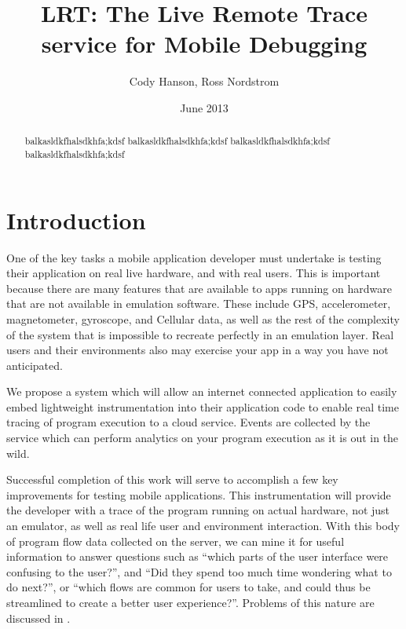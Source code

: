 \documentclass[11pt]{article}
\begin{document}
\title{LRT: The Live Remote Trace service for Mobile Debugging}
\author{Cody Hanson, Ross Nordstrom}
\date{June 2013}

\maketitle

\begin{abstract}
balkasldkfhalsdkhfa;kdsf
balkasldkfhalsdkhfa;kdsf
balkasldkfhalsdkhfa;kdsf
balkasldkfhalsdkhfa;kdsf

\end{abstract}

\section{Introduction}
One of the key tasks a mobile application developer must undertake is testing 
their application on real live hardware, and with real users. This is important 
because there are many features that are available to apps running on hardware 
that are not available in emulation software. These include GPS, accelerometer, 
magnetometer, gyroscope, and Cellular data, as well as the rest of the 
complexity of the system that is impossible to recreate perfectly in an 
emulation layer. Real users and their environments also may exercise your app in
a way you have not anticipated. 

\cite{Enck:2010:TIT:1924943.1924971}

We propose a system which will allow an internet connected application to easily
embed lightweight instrumentation into their application code to enable real 
time tracing of program execution to a cloud service. Events are collected by 
the service which can perform analytics on your program execution as it is out 
in the wild.

Successful completion of this work will serve to accomplish a few key 
improvements for testing mobile applications. This instrumentation will provide 
the developer with a trace of the program running on actual hardware, not just 
an emulator, as well as real life user and environment interaction. With this 
body of program flow data collected on the server, we can mine it for useful 
information to answer questions such as “which parts of the user interface were 
confusing to the user?”, and “Did they spend too much time wondering what to do 
next?”, or “which flows are common for users to take, and could thus be 
streamlined to create a better user experience?”. Problems of this nature are 
discussed in \cite{WebAntiPattern}.
\end{document}

